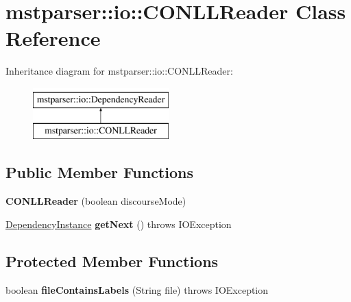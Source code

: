 \hypertarget{classmstparser_1_1io_1_1CONLLReader}{
\section{mstparser::io::CONLLReader Class Reference}
\label{classmstparser_1_1io_1_1CONLLReader}
}
Inheritance diagram for mstparser::io::CONLLReader:\begin{figure}[H]
\begin{center}
\leavevmode
\includegraphics[height=2cm]{classmstparser_1_1io_1_1CONLLReader}
\end{center}
\end{figure}
\subsection*{Public Member Functions}
\begin{DoxyCompactItemize}
\item 
\hypertarget{classmstparser_1_1io_1_1CONLLReader_af2e3375ba9d59eeae45845c5f2bbd60f}{
{\bfseries CONLLReader} (boolean discourseMode)}
\label{classmstparser_1_1io_1_1CONLLReader_af2e3375ba9d59eeae45845c5f2bbd60f}

\item 
\hypertarget{classmstparser_1_1io_1_1CONLLReader_a2abcb2c5d6aae9240a42afcef10a4ccc}{
\hyperlink{classmstparser_1_1DependencyInstance}{DependencyInstance} {\bfseries getNext} ()  throws IOException }
\label{classmstparser_1_1io_1_1CONLLReader_a2abcb2c5d6aae9240a42afcef10a4ccc}

\end{DoxyCompactItemize}
\subsection*{Protected Member Functions}
\begin{DoxyCompactItemize}
\item 
\hypertarget{classmstparser_1_1io_1_1CONLLReader_a9c0574130bd566b1bf98ddc04ae7affe}{
boolean {\bfseries fileContainsLabels} (String file)  throws IOException }
\label{classmstparser_1_1io_1_1CONLLReader_a9c0574130bd566b1bf98ddc04ae7affe}

\end{DoxyCompactItemize}
